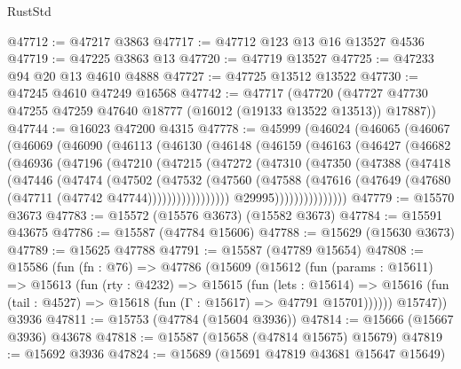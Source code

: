 \begin{lexlean}{RustStd}
\begin{coremodule}
@47712 := @47217 @3863
@47717 := @47712 @123 @13 @16 @13527 @4536
@47719 := @47225 @3863 @13
@47720 := @47719 @13527
@47725 := @47233 @94 @20 @13 @4610 @4888
@47727 := @47725 @13512 @13522
@47730 := @47245 @4610 @47249 @16568
@47742 := @47717
    (@47720 (@47727 @47730 @47255 @47259 @47640 @18777 (@16012 (@19133 @13522 @13513)) @17887))
@47744 := @16023 @47200 @4315
@47778 := @45999
    (@46024
      (@46065
        (@46067
          (@46069
            (@46090
              (@46113
                (@46130
                  (@46148
                    (@46159
                      (@46163
                        (@46427
                          (@46682
                            (@46936
                              (@47196
                                (@47210
                                  (@47215
                                    (@47272
                                      (@47310
                                        (@47350
                                          (@47388
                                            (@47418
                                              (@47446
                                                (@47474
                                                  (@47502
                                                    (@47532
                                                      (@47560
                                                        (@47588
                                                          (@47616
                                                            (@47649
                                                              (@47680
                                                                (@47711
                                                                  (@47742 @47744)))))))))))))))))
                                  @29995)))))))))))))))
@47779 := @15570 @3673
@47783 := @15572 (@15576 @3673) (@15582 @3673)
@47784 := @15591 @43675
@47786 := @15587 (@47784 @15606)
@47788 := @15629 (@15630 @3673)
@47789 := @15625 @47788
@47791 := @15587 (@47789 @15654)
@47808 := @15586
    (fun (fn : @76) =>
    @47786
      (@15609
        (@15612
          (fun (params : @15611) =>
          @15613
            (fun (rty : @4232) =>
            @15615
              (fun (lets : @15614) =>
              @15616 (fun (tail : @4527) => @15618 (fun (Γ : @15617) => @47791 @15701))))))
        @15747))
    @3936
@47811 := @15753 (@47784 (@15604 @3936))
@47814 := @15666 (@15667 @3936) @43678
@47818 := @15587 (@15658 (@47814 @15675) @15679)
@47819 := @15692 @3936
@47824 := @15689 (@15691 @47819 @43681 @15647 @15649)

\end{coremodule}
\end{lexlean}
